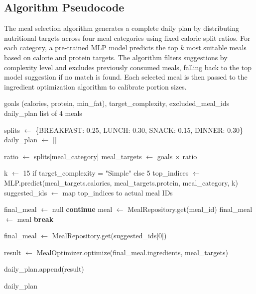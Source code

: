 \clearpage
\subsection{Algorithm Pseudocode}

The meal selection algorithm generates a complete daily plan by distributing nutritional 
targets across four meal categories using fixed caloric split ratios. For each category, 
a pre-trained MLP model predicts the top $k$ most suitable meals based on calorie and 
protein targets. The algorithm filters suggestions by complexity level and excludes 
previously consumed meals, falling back to the top model suggestion if no match is found. 
Each selected meal is then passed to the ingredient optimization algorithm to calibrate 
portion sizes.

\begin{algorithm}
\caption{Meal Selection Algorithm}
\begin{algorithmic}[1]
\Require goals (calories, protein, min\_fat), target\_complexity, excluded\_meal\_ids
\Ensure daily\_plan list of 4 meals

\State splits $\gets$ \{BREAKFAST: 0.25, LUNCH: 0.30, SNACK: 0.15, DINNER: 0.30\}
\State daily\_plan $\gets$ []

    \State ratio $\gets$ splits[meal\_category]
    \State meal\_targets $\gets$ goals $\times$ ratio

    \State k $\gets$ 15 if target\_complexity = "Simple" else 5
    \State top\_indices $\gets$ MLP.predict(meal\_targets.calories, meal\_targets.protein, meal\_category, k)
    \State suggested\_ids $\gets$ map top\_indices to actual meal IDs

    \State final\_meal $\gets$ null
         \textbf{continue} \EndIf
        \State meal $\gets$ MealRepository.get(meal\_id)
            \State final\_meal $\gets$ meal
            \State \textbf{break}
        \EndIf
    \EndFor

        \State final\_meal $\gets$ MealRepository.get(suggested\_ids[0]) 
    \EndIf

    \State result $\gets$ MealOptimizer.optimize(final\_meal.ingredients, meal\_targets)

    \State daily\_plan.append(result)
\EndFor

\State \Return daily\_plan
\end{algorithmic}
\end{algorithm}

